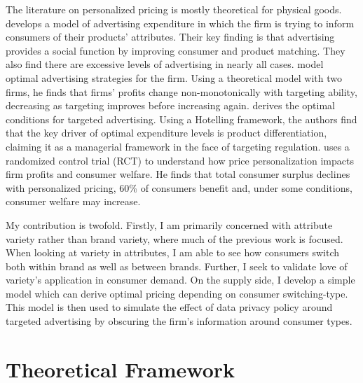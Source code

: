 \documentclass[12pt]{article}
\theoremstyle{definition}
\theoremstyle{remark}
\begin{document}

The literature on personalized pricing is mostly theoretical for physical goods. \citet{grossman_informative_1984} develops a model of advertising expenditure in which the firm is trying to inform consumers of their products' attributes. Their key finding is that advertising provides a social function by improving consumer and product matching. They also find there are excessive levels of advertising in nearly all cases. \citet{karle_imperfect_nodate} model optimal advertising strategies for the firm. Using a theoretical model with two firms, he finds that firms' profits change non-monotonically with targeting ability, decreasing as targeting improves before increasing again. \citet{moorthy_targeting_2023} derives the optimal conditions for targeted advertising. Using a Hotelling framework, the authors find that the key driver of optimal expenditure levels is product differentiation, claiming it as a managerial framework in the face of targeting regulation. \citet{dube_personalized_2023} uses a randomized control trial (RCT) to understand how price personalization impacts firm profits and consumer welfare. He finds that total consumer surplus declines with personalized pricing, 60\% of consumers benefit and, under some conditions, consumer welfare may increase.


My contribution is twofold. Firstly, I am primarily concerned with attribute variety rather than brand variety, where much of the previous work is focused. When looking at variety in attributes, I am able to see how consumers switch both within brand as well as between brands. Further, I seek to validate love of variety's application in consumer demand. On the supply side, I develop a simple model which can derive optimal pricing depending on consumer switching-type. This model is then used to simulate the effect of data privacy policy around targeted advertising by obscuring the firm's information around consumer types. 




\section{Theoretical Framework}
\label{sec:theory}
\end{document}
